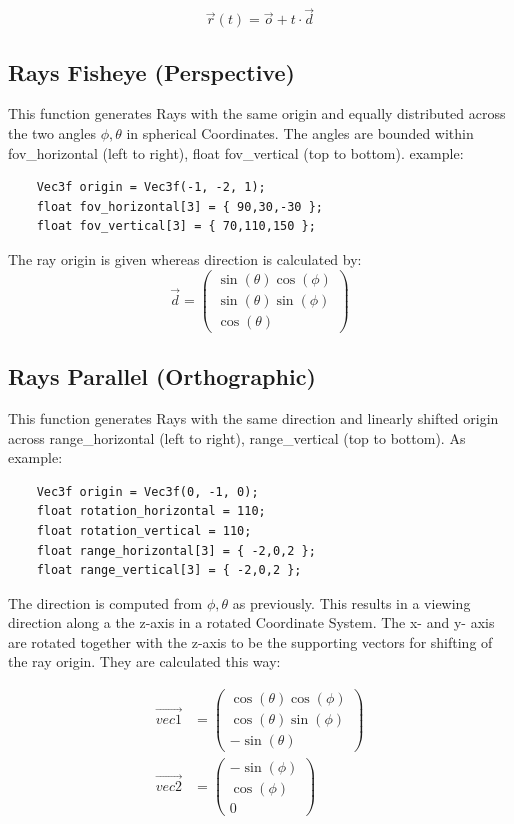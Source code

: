 \documentclass[11pt,a4paper,oneside]{article}
\begin{document}
\begin{equation}
\vec{r}(t) = \vec{o} + t \cdot \vec{d}
\end{equation}

\subsection{Rays Fisheye (Perspective)}

This function generates Rays with the same origin and equally distributed across the two angles $\phi,\theta$ in spherical Coordinates. The angles are bounded within fov\_horizontal (left to right), float fov\_vertical (top to bottom). example:

\begin{verbatim}
    Vec3f origin = Vec3f(-1, -2, 1);
    float fov_horizontal[3] = { 90,30,-30 };
    float fov_vertical[3] = { 70,110,150 };
\end{verbatim}

The ray origin is given whereas direction is calculated by:
\begin{equation}
\vec{d} = \begin{pmatrix} \sin(\theta) \cos(\phi) \\ \sin(\theta) \sin(\phi) \\ \cos(\theta) \end{pmatrix}
\end{equation}

\subsection{Rays Parallel (Orthographic)}
This function generates Rays with the same direction and linearly shifted origin across range\_horizontal (left to right), range\_vertical (top to bottom). As example:

\begin{verbatim}
    Vec3f origin = Vec3f(0, -1, 0);
    float rotation_horizontal = 110;
    float rotation_vertical = 110;
    float range_horizontal[3] = { -2,0,2 };
    float range_vertical[3] = { -2,0,2 };
\end{verbatim}


The direction is computed from $\phi,\theta$ as previously. This results in a viewing direction along a the z-axis in a rotated Coordinate System. The x- and y- axis are rotated together with the z-axis to be the supporting vectors for shifting of the ray origin. They are calculated this way:

\begin{align}
\vec{vec1} &= \begin{pmatrix} \cos(\theta) \cos(\phi) \\ \cos(\theta) \sin(\phi) \\ -\sin(\theta) \end{pmatrix} \\
\vec{vec2} &= \begin{pmatrix} -\sin(\phi) \\ \cos(\phi) \\ 0 \end{pmatrix}
\end{align}
\end{document}
